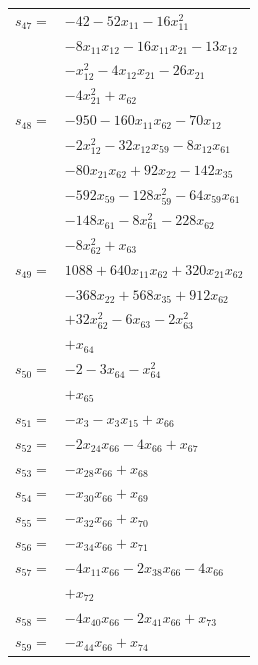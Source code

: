\begin{longtable}{@{}r@{\;}l@{}}
\(s_{47}=\) & \(\displaystyle -42 -52x_{11} -16x_{11}^{2}\) \\
 & \(\displaystyle -8x_{11}x_{12} -16x_{11}x_{21} -13x_{12}\) \\
 & \(\displaystyle -x_{12}^{2} -4x_{12}x_{21} -26x_{21}\) \\
 & \(\displaystyle -4x_{21}^{2} +x_{62}\) \\[3pt]
\(s_{48}=\) & \(\displaystyle -950 -160x_{11}x_{62} -70x_{12}\) \\
 & \(\displaystyle -2x_{12}^{2} -32x_{12}x_{59} -8x_{12}x_{61}\) \\
 & \(\displaystyle -80x_{21}x_{62} +92x_{22} -142x_{35}\) \\
 & \(\displaystyle -592x_{59} -128x_{59}^{2} -64x_{59}x_{61}\) \\
 & \(\displaystyle -148x_{61} -8x_{61}^{2} -228x_{62}\) \\
 & \(\displaystyle -8x_{62}^{2} +x_{63}\) \\[3pt]
\(s_{49}=\) & \(\displaystyle 1088 +640x_{11}x_{62} +320x_{21}x_{62}\) \\
 & \(\displaystyle -368x_{22} +568x_{35} +912x_{62}\) \\
 & \(\displaystyle +32x_{62}^{2} -6x_{63} -2x_{63}^{2}\) \\
 & \(\displaystyle +x_{64}\) \\[3pt]
\(s_{50}=\) & \(\displaystyle -2 -3x_{64} -x_{64}^{2}\) \\
 & \(\displaystyle +x_{65}\) \\[3pt]
\(s_{51}=\) & \(\displaystyle -x_{3} -x_{3}x_{15} +x_{66}\) \\[3pt]
\(s_{52}=\) & \(\displaystyle -2x_{24}x_{66} -4x_{66} +x_{67}\) \\[3pt]
\(s_{53}=\) & \(\displaystyle -x_{28}x_{66} +x_{68}\) \\[3pt]
\(s_{54}=\) & \(\displaystyle -x_{30}x_{66} +x_{69}\) \\[3pt]
\(s_{55}=\) & \(\displaystyle -x_{32}x_{66} +x_{70}\) \\[3pt]
\(s_{56}=\) & \(\displaystyle -x_{34}x_{66} +x_{71}\) \\[3pt]
\(s_{57}=\) & \(\displaystyle -4x_{11}x_{66} -2x_{38}x_{66} -4x_{66}\) \\
 & \(\displaystyle +x_{72}\) \\[3pt]
\(s_{58}=\) & \(\displaystyle -4x_{40}x_{66} -2x_{41}x_{66} +x_{73}\) \\[3pt]
\(s_{59}=\) & \(\displaystyle -x_{44}x_{66} +x_{74}\) \\[3pt]

\end{longtable}

